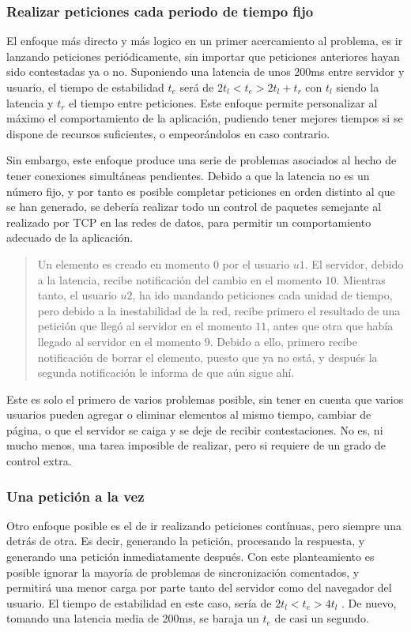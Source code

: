 \subsubsection{Realizar peticiones cada periodo de tiempo fijo} %
\label{ssub:nunca_tener_más_de_una_petición_pendiente}
El enfoque más directo y más logico en un primer acercamiento al problema, es ir lanzando peticiones periódicamente, sin importar que peticiones anteriores hayan sido contestadas ya o no. Suponiendo una latencia de unos 200ms entre servidor y usuario, el tiempo de estabilidad $t_e$ será de $ 2t_l < t_e > 2t_l + t_r$ con $t_l$ siendo la latencia y $t_r$ el tiempo entre peticiones. Este enfoque permite personalizar al máximo el comportamiento de la aplicación, pudiendo tener mejores tiempos si se dispone de recursos suficientes, o empeorándolos en caso contrario.

Sin embargo, este enfoque produce una serie de problemas asociados al hecho de tener conexiones simultáneas pendientes. Debido a que la latencia no es un número fijo, y por tanto es posible completar peticiones en orden distinto al que se han generado, se debería realizar todo un control de paquetes semejante al realizado por TCP en las redes de datos, para permitir un comportamiento adecuado de la aplicación.

\begin{quotation}
  Un elemento es creado en momento $0$ por el usuario $u1$. El servidor, debido a la latencia, recibe notificación del cambio en el momento $10$. Mientras tanto, el usuario $u2$, ha ido mandando peticiones cada unidad de tiempo, pero debido a la inestabilidad de la red, recibe primero el resultado de una petición que llegó al servidor en el momento $11$, antes que otra que había llegado al servidor en el momento $9$. Debido a ello, primero recibe notificación de borrar el elemento, puesto que ya no está, y después la segunda notificación le informa de que aún sigue ahí.
\end{quotation}

Este es solo el primero de varios problemas posible, sin tener en cuenta que varios usuarios pueden agregar o eliminar elementos al mismo tiempo, cambiar de página, o que el servidor se caiga y se deje de recibir contestaciones. No es, ni mucho menos, una tarea imposible de realizar, pero si requiere de un grado de control extra.


\subsubsection{Una petición a la vez} %
\label{ssub:una_peticion_a_la_vez}
Otro enfoque posible es el de ir realizando peticiones contínuas, pero siempre una detrás de otra. Es decir, generando la petición, procesando la respuesta, y generando una petición inmediatamente después. Con este planteamiento es posible ignorar la mayoría de problemas de sincronización comentados, y permitirá una menor carga por parte tanto del servidor como del navegador del usuario. El tiempo de estabilidad en este caso, sería de $ 2t_l < t_e > 4t_l$ . De nuevo, tomando una latencia media de 200ms, se baraja un $t_e$ de casi un segundo.

